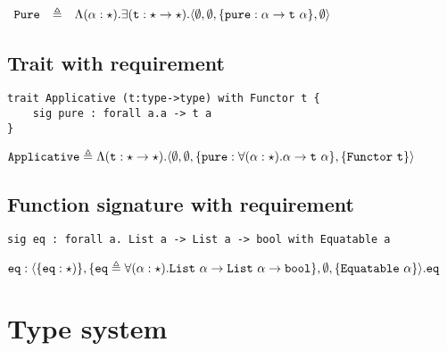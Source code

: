 \documentclass{article}[11pt]
\newcommand{\term}[1]{\verb~#1~}
\begin{document}
    \noindent
    \begin{math}
        \begin{array}{rclp{5cm}}
            \term{Pure} & \triangleq & \Lambda(\alpha:\star).\exists(\term{t}:\star \rightarrow \star).\langle
            \emptyset,
            \emptyset,
            \{ \term{pure} : \alpha \rightarrow \term{t}~\alpha \},
            \emptyset
            \rangle
        \end{array}
    \end{math}

    \subsection{Trait with requirement}\label{subsec:trait-with-requirement}

    \begin{verbatim}
trait Applicative (t:type->type) with Functor t {
    sig pure : forall a.a -> t a
}
    \end{verbatim}

    \noindent
    \begin{math}
        \term{Applicative} \triangleq \Lambda(\term{t}:\star \rightarrow \star).
        \langle
        \emptyset,
        \emptyset,
        \{ \term{pure} : \forall(\alpha:\star).\alpha \rightarrow \term{t}~\alpha \},
        \{ \term{Functor}~\term{t} \}
        \rangle
    \end{math}

    \subsection{Function signature with requirement}\label{subsec:function-signature-with-requirement}

    \begin{verbatim}
sig eq : forall a. List a -> List a -> bool with Equatable a
    \end{verbatim}

    \noindent
    \begin{math}
        \term{eq} : \langle
        \{ \term{eq} : \star)\},
        \{ \term{eq} \triangleq \forall(\alpha:\star).\term{List}~\alpha \rightarrow \term{List}~\alpha \rightarrow \term{bool} \},
        \emptyset,
        \{ \term{Equatable} ~ \alpha \}
        \rangle.\term{eq}
    \end{math}


    \section{Type system}\label{sec:type-system}
\end{document}
